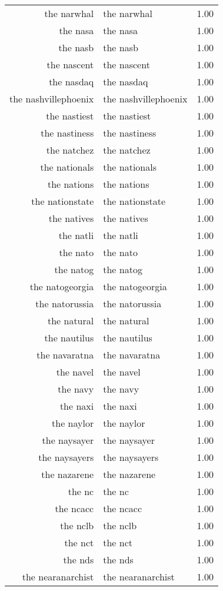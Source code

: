 \begin{table}[ht]
\begin{tabular}{rlr}
  the narwhal & the narwhal & 1.00 \\ 
  the nasa & the nasa & 1.00 \\ 
  the nasb & the nasb & 1.00 \\ 
  the nascent & the nascent & 1.00 \\ 
  the nasdaq & the nasdaq & 1.00 \\ 
  the nashvillephoenix & the nashvillephoenix & 1.00 \\ 
  the nastiest & the nastiest & 1.00 \\ 
  the nastiness & the nastiness & 1.00 \\ 
  the natchez & the natchez & 1.00 \\ 
  the nationals & the nationals & 1.00 \\ 
  the nations & the nations & 1.00 \\ 
  the nationstate & the nationstate & 1.00 \\ 
  the natives & the natives & 1.00 \\ 
  the natli & the natli & 1.00 \\ 
  the nato & the nato & 1.00 \\ 
  the natog & the natog & 1.00 \\ 
  the natogeorgia & the natogeorgia & 1.00 \\ 
  the natorussia & the natorussia & 1.00 \\ 
  the natural & the natural & 1.00 \\ 
  the nautilus & the nautilus & 1.00 \\ 
  the navaratna & the navaratna & 1.00 \\ 
  the navel & the navel & 1.00 \\ 
  the navy & the navy & 1.00 \\ 
  the naxi & the naxi & 1.00 \\ 
  the naylor & the naylor & 1.00 \\ 
  the naysayer & the naysayer & 1.00 \\ 
  the naysayers & the naysayers & 1.00 \\ 
  the nazarene & the nazarene & 1.00 \\ 
  the nc & the nc & 1.00 \\ 
  the ncacc & the ncacc & 1.00 \\ 
  the nclb & the nclb & 1.00 \\ 
  the nct & the nct & 1.00 \\ 
  the nds & the nds & 1.00 \\ 
  the nearanarchist & the nearanarchist & 1.00 \\ 

\end{tabular}
\end{table}
